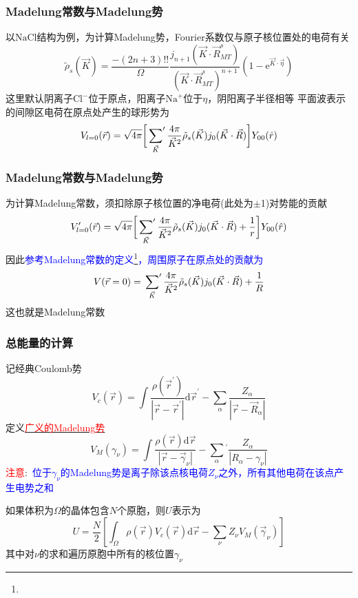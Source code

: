 \frame
{
	\frametitle{\textrm{Madelung}常数与\textrm{Madelung}势}
	以$\mathrm{NaCl}$结构为例，为计算\textrm{Madelung}势，\textrm{Fourier}系数仅与原子核位置处的电荷有关
\begin{displaymath}
	\tilde\rho_s(\vec K)=\dfrac{-(2n+3)!!}{\Omega}\dfrac{j_{n+1}(\vec K\cdot\vec R_{MT}^s)}{(\vec K\cdot\vec R_{MT}^s)^{n+1}}(1-\mathrm{e}^{\vec K\cdot\vec\eta})
\end{displaymath}
这里默认阴离子$\mathrm{Cl}^{-}$位于原点，阳离子$\mathrm{Na}^{+}$位于$\eta$，阴阳离子半径相等
\vskip 10pt
	平面波表示的间隙区电荷在原点处产生的球形势为
	\begin{displaymath}
		V_{l=0}(\vec r)=\sqrt{4\pi}\bigg[\sideset{}{^{\prime}}\sum_{\vec K}\dfrac{4\pi}{\vec K^2}\tilde\rho_s(\vec K)j_0(\vec K\cdot\vec R)\bigg]Y_{00}(\hat r)
	\end{displaymath}
}

\frame
{
	\frametitle{\textrm{Madelung}常数与\textrm{Madelung}势}
	为计算\textrm{Madelung}常数，须扣除原子核位置的净电荷(此处为$\pm$1)对势能的贡献
	\begin{displaymath}
		V_{l=0}^{\prime}(\vec r)=\sqrt{4\pi}\bigg[\sideset{}{^{\prime}}\sum_{\vec K}\dfrac{4\pi}{\vec K^2}\tilde\rho_s(\vec K)j_0(\vec K\cdot\vec R)+\dfrac1r\bigg]Y_{00}(\hat r)
	\end{displaymath}
	因此\textcolor{blue}{参考\textrm{Madelung}常数的定义\footnote{\fontsize{7.2pt}{6.2pt}}，周围原子在原点处的贡献为}
	\begin{displaymath}
		V(\vec r=0)=\sideset{}{^{\prime}}\sum_{\vec K}\dfrac{4\pi}{\vec K^2}\tilde\rho_s(\vec K)j_0(\vec K\cdot\vec R)+\dfrac1R
	\end{displaymath}
	这也就是\textrm{Madelung}常数
}

\frame
{
	\frametitle{总能量的计算}
	记经典\textrm{Coulomb}势
	\begin{displaymath}
		V_c(\vec r)=\int\dfrac{\rho(\vec r^{\prime})}{|\vec r-\vec r^{\prime}|}\mathrm{d}\vec r^{\prime}-\sum_{\alpha}\dfrac{Z_{\alpha}}{|\vec r-\vec R_{\alpha}|}
	\end{displaymath}
	定义\underline{\textcolor{red}{广义的\textrm{Madelung}势}}
	\begin{displaymath}
		V_M(\gamma_{\nu})=\int\dfrac{\rho(\vec r)\mathrm{d}\vec r}{|\vec r-\vec \gamma_{\nu}|}-\sum_{\alpha}{}^{\prime}\dfrac{Z_{\alpha}}{|R_{\alpha}-\gamma_{\nu}|}
	\end{displaymath}
	\textcolor{red}{注意}:~\textcolor{blue}{位于\textrm{$\gamma_{\nu}$的\textrm{Madelung}势是离子除该点核电荷$Z_{\nu}$之外，所有其他电荷在该点产生电势之和}}

	如果体积为$\Omega$的晶体包含$N$个原胞，则$U$表示为
	\begin{displaymath}
		U=\dfrac N2\left[\int_{\Omega}\rho(\vec r)V_c(\vec r)\mathrm{d}\vec r-\sum_{\nu}Z_{\nu}V_M(\vec \gamma_{\nu})\right]
	\end{displaymath}
	其中对$\nu$的求和遍历原胞中所有的核位置$\gamma_{\nu}$
}


